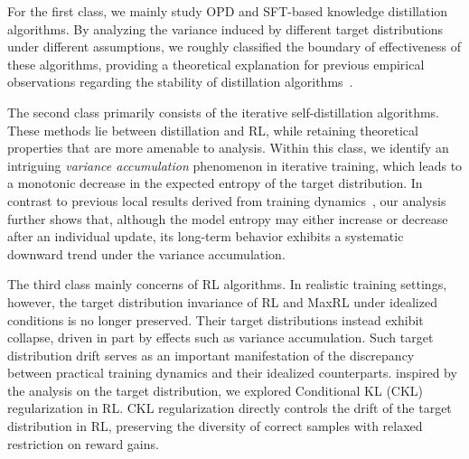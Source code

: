 For the first class, we mainly study OPD and SFT-based knowledge distillation~\citep{hinton_distilling_2015} algorithms. By analyzing the variance induced by different target distributions under different assumptions, we roughly classified the boundary of effectiveness of these algorithms, providing a theoretical explanation for previous empirical observations regarding the stability of distillation algorithms~\citep{li_rethinking_2026, oh_kl_2026}.

The second class primarily consists of the iterative self-distillation algorithms. These methods lie between distillation and RL, while retaining theoretical properties that are more amenable to analysis. Within this class, we identify an intriguing \emph{variance accumulation} phenomenon in iterative training, which leads to a monotonic decrease in the expected entropy of the target distribution. In contrast to previous local results derived from training dynamics~\citep{cui_entropy_2025, ren_learning_2025, jin_revisiting_2026}, our analysis further shows that, although the model entropy may either increase or decrease after an individual update, its long-term behavior exhibits a systematic downward trend under the variance accumulation.

The third class mainly concerns of RL algorithms. In realistic training settings, however, the target distribution invariance of RL and MaxRL under idealized conditions is no longer preserved. Their target distributions instead exhibit collapse, driven in part by effects such as variance accumulation. Such target distribution drift serves as an important manifestation of the discrepancy between practical training dynamics and their idealized counterparts. inspired by the analysis on the target distribution, we explored Conditional KL (CKL) regularization in RL. CKL regularization directly controls the drift of the target distribution in RL, preserving the diversity of correct samples with relaxed restriction on reward gains.



